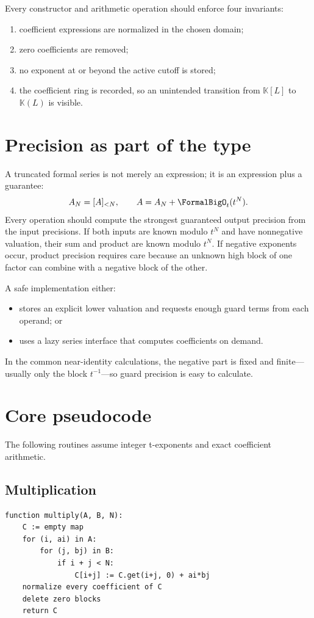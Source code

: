 \documentclass[11pt,openany]{book}
\theoremstyle{definition}
\theoremstyle{plain}
\theoremstyle{remark}
\newcommand{\K}{\mathbb{K}}
\begin{document}
Every constructor and arithmetic operation should enforce four invariants:
\begin{enumerate}
\item coefficient expressions are normalized in the chosen domain;
\item zero coefficients are removed;
\item no exponent at or beyond the active cutoff is stored;
\item the coefficient ring is recorded, so an unintended transition from
      \(\K[L]\) to \(\K(L)\) is visible.
\end{enumerate}

\section{Precision as part of the type}
A truncated formal series is not merely an expression; it is an expression plus
a guarantee:
\[
 A_N=[A]_{<N},
 \qquad A=A_N+\FormalBigO_t(t^N).
\]
Every operation should compute the strongest guaranteed output precision from
the input precisions.  If both inputs are known modulo \(t^N\) and have
nonnegative valuation, their sum and product are known modulo \(t^N\).  If
negative exponents occur, product precision requires care because an unknown
high block of one factor can combine with a negative block of the other.

A safe implementation either:
\begin{itemize}
\item stores an explicit lower valuation and requests enough guard terms from
      each operand; or
\item uses a lazy series interface that computes coefficients on demand.
\end{itemize}
In the common near-identity calculations, the negative part is fixed and
finite---usually only the block \(t^{-1}\)---so guard precision is easy to
calculate.

\section{Core pseudocode}
The following routines assume integer t-exponents and exact coefficient
arithmetic.

\subsection{Multiplication}
\begin{lstlisting}[style=pseudostyle]
function multiply(A, B, N):
    C := empty map
    for (i, ai) in A:
        for (j, bj) in B:
            if i + j < N:
                C[i+j] := C.get(i+j, 0) + ai*bj
    normalize every coefficient of C
    delete zero blocks
    return C
\end{lstlisting}
\end{document}
